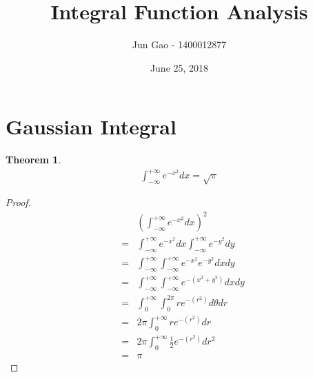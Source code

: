 \documentclass[12pt]{article}
\newtheorem{theorem}{Theorem}[section]
\begin{document}
 
\title{Integral Function Analysis}
\author{Jun Gao - 1400012877}
\date{June 25, 2018}

\maketitle
\section{Gaussian Integral}
\begin{theorem}
	\begin{eqnarray}
	\int_{-\infty}^{+\infty} e^{-x^2} dx = \sqrt{\pi}
	\end{eqnarray}
\end{theorem}
\begin{proof}
\begin{eqnarray}
	&&\left(\int_{-\infty}^{+\infty} e^{-x^2} dx\right)^2\\
	&=&\int_{-\infty}^{+\infty} e^{-x^2} dx \int_{-\infty}^{+\infty} e^{-y^2} dy\\
	&=& \int_{-\infty}^{+\infty}\int_{-\infty}^{+\infty} e^{-x^2} e^{-y^2} dxdy\\
	&=&\int_{-\infty}^{+\infty}\int_{-\infty}^{+\infty} e^{-(x^2+y^2)}dxdy\\
	&=&\int_{0}^{+\infty}\int_{0}^{2\pi} re^{-(r^2)}d\theta dr\\
	&=&2\pi \int_{0}^{+\infty}re^{-(r^2)} dr\\
	&=&2\pi \int_{0}^{+\infty}\frac{1}{2}e^{-(r^2)} dr^2\\
	&=&\pi
\end{eqnarray}
\end{proof}
\end{document}
